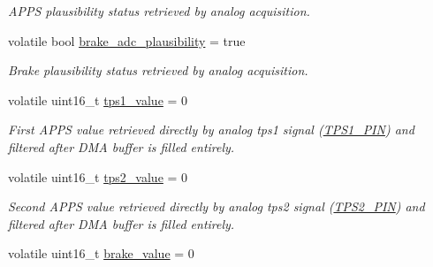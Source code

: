 \begin{DoxyCompactItemize}
\begin{DoxyCompactList}\small\item\em A\+P\+PS plausibility status retrieved by analog acquisition. \end{DoxyCompactList}\item 
\mbox{\label{group___board__model__group_gaf6aa7f974533c4306128757d0634572a}} 
volatile bool \mbox{\hyperlink{group___board__model__group_gaf6aa7f974533c4306128757d0634572a}{brake\+\_\+adc\+\_\+plausibility}} = true
\begin{DoxyCompactList}\small\item\em Brake plausibility status retrieved by analog acquisition. \end{DoxyCompactList}\item 
\mbox{\label{group___board__model__group_ga3d6043851868b7da3c1d6381f835a559}} 
volatile uint16\+\_\+t \mbox{\hyperlink{group___board__model__group_ga3d6043851868b7da3c1d6381f835a559}{tps1\+\_\+value}} = 0
\begin{DoxyCompactList}\small\item\em First A\+P\+PS value retrieved directly by analog tps1 signal (\mbox{\hyperlink{group___board__model__group_gae9aa914854f611488701c96a330b0bd4}{T\+P\+S1\+\_\+\+P\+IN}}) and filtered after D\+MA buffer is filled entirely. \end{DoxyCompactList}\item 
\mbox{\label{group___board__model__group_gaa8a9b03858f40eadfd5d3d6c3e266834}} 
volatile uint16\+\_\+t \mbox{\hyperlink{group___board__model__group_gaa8a9b03858f40eadfd5d3d6c3e266834}{tps2\+\_\+value}} = 0
\begin{DoxyCompactList}\small\item\em Second A\+P\+PS value retrieved directly by analog tps2 signal (\mbox{\hyperlink{group___board__model__group_gab13a816bae3ca994897fc6f1cb590a67}{T\+P\+S2\+\_\+\+P\+IN}}) and filtered after D\+MA buffer is filled entirely. \end{DoxyCompactList}\item 
\mbox{\label{group___board__model__group_gad7966e70fb4bebc6947eb3fbb059a3c9}} 
volatile uint16\+\_\+t \mbox{\hyperlink{group___board__model__group_gad7966e70fb4bebc6947eb3fbb059a3c9}{brake\+\_\+value}} = 0

\end{DoxyCompactItemize}
